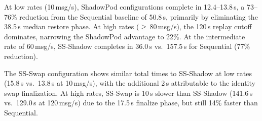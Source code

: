 \documentclass[conference]{IEEEtran}
\begin{document}
%
At low rates (10\,msg/s), ShadowPod configurations complete in
12.4--13.8\,s, a 73--76\% reduction from the Sequential baseline of 50.8\,s,
primarily by eliminating the 38.5\,s median restore phase. At high rates
($\geq$\,80\,msg/s), the 120\,s replay cutoff dominates, narrowing the
ShadowPod advantage to 22\%. At the intermediate rate of 60\,msg/s, SS-Shadow
completes in 36.0\,s vs.\ 157.5\,s for Sequential (77\% reduction).

The SS-Swap configuration shows similar total times to SS-Shadow at low rates
(15.8\,s vs.\ 13.8\,s at 10\,msg/s), with the additional 2\,s attributable to
the identity swap finalization. At high rates, SS-Swap is 10\,s slower than
SS-Shadow (141.6\,s vs.\ 129.0\,s at 120\,msg/s) due to the 17.5\,s finalize
phase, but still 14\% faster than Sequential.
\end{document}
